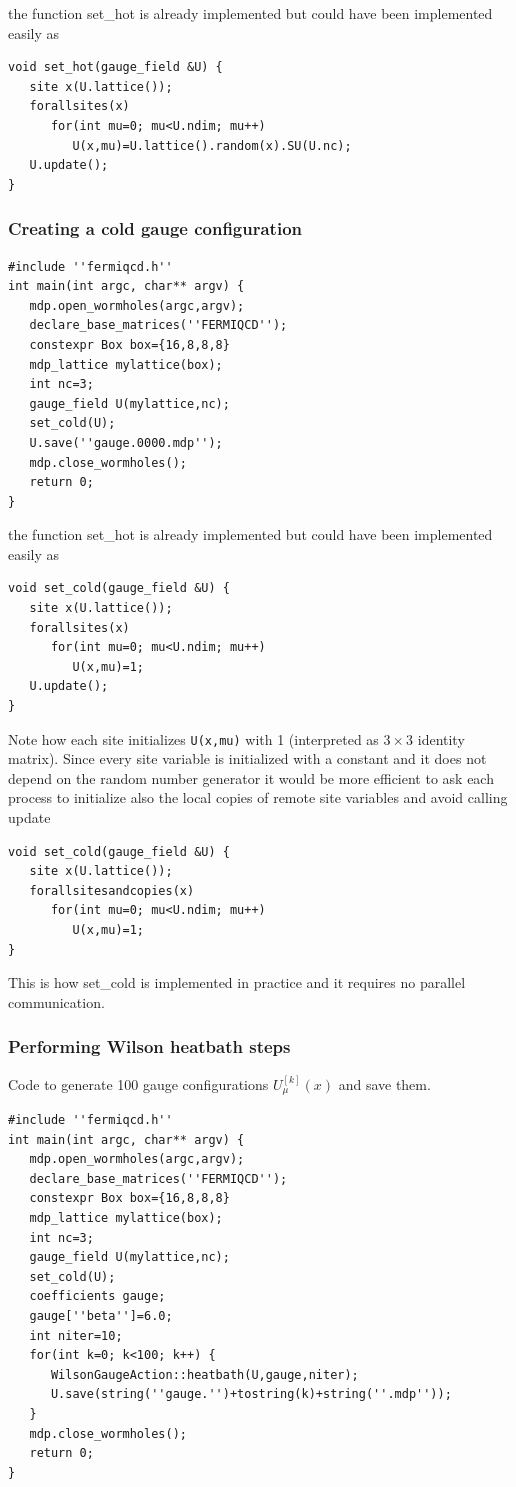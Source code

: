 the function set\_hot is already implemented but could have been implemented
easily as
\begin{verbatim}
void set_hot(gauge_field &U) {
   site x(U.lattice());
   forallsites(x)
      for(int mu=0; mu<U.ndim; mu++)
         U(x,mu)=U.lattice().random(x).SU(U.nc);
   U.update();
}
\end{verbatim}

\subsubsection{Creating a cold gauge configuration}
\begin{verbatim}
#include ''fermiqcd.h''
int main(int argc, char** argv) {
   mdp.open_wormholes(argc,argv);
   declare_base_matrices(''FERMIQCD'');
   constexpr Box box={16,8,8,8}
   mdp_lattice mylattice(box);
   int nc=3;
   gauge_field U(mylattice,nc);
   set_cold(U);
   U.save(''gauge.0000.mdp'');
   mdp.close_wormholes();
   return 0;
}
\end{verbatim}

the function set\_hot is already implemented but could have been implemented
easily as
\begin{verbatim}
void set_cold(gauge_field &U) {
   site x(U.lattice());
   forallsites(x)
      for(int mu=0; mu<U.ndim; mu++)
         U(x,mu)=1;
   U.update();
}
\end{verbatim}

Note how each site initializes {\tt U(x,mu)} with 1 (interpreted as $3\times
3$ identity matrix). Since every site variable is initialized with a
constant and it does not depend on the random number generator it would be
more efficient to ask each process to initialize also the local copies of
remote site variables and avoid calling update
\begin{verbatim}
void set_cold(gauge_field &U) {
   site x(U.lattice());
   forallsitesandcopies(x)
      for(int mu=0; mu<U.ndim; mu++)
         U(x,mu)=1;
}
\end{verbatim}

This is how set\_cold is implemented in practice and it requires no parallel
communication.

\subsubsection{Performing Wilson heatbath steps}

Code to generate 100 gauge configurations $U_\mu ^{[k]}(x)$ and save them.
\begin{verbatim}
#include ''fermiqcd.h''
int main(int argc, char** argv) {
   mdp.open_wormholes(argc,argv);
   declare_base_matrices(''FERMIQCD'');
   constexpr Box box={16,8,8,8}
   mdp_lattice mylattice(box);
   int nc=3;
   gauge_field U(mylattice,nc);
   set_cold(U);
   coefficients gauge;
   gauge[''beta'']=6.0;
   int niter=10;
   for(int k=0; k<100; k++) {
      WilsonGaugeAction::heatbath(U,gauge,niter);
      U.save(string(''gauge.'')+tostring(k)+string(''.mdp''));
   }
   mdp.close_wormholes();
   return 0;
}
\end{verbatim}

